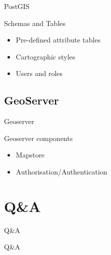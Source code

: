 \begin{frame}{PostGIS}
	\begin{block}{Schemas and Tables}
		\begin{itemize}
			\item Pre-defined attribute tables
			\item Cartographic styles
			\item Users and roles
		\end{itemize}
	\end{block}
\end{frame}

\subsection{GeoServer}
\begin{frame}{Geoserver}
	\begin{block}{Geoserver components}
		\begin{itemize}
			\item Mapstore
			\item Authorisation/Authentication
		\end{itemize}
	\end{block}
\end{frame}

\section{Q\&A}

\begin{frame}{Q\&A}
	\begin{block}{Q\&A}
	\end{block}
\end{frame}